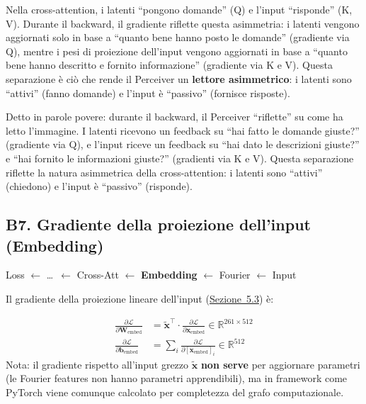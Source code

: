 \documentclass[12pt,a4paper]{article}
\begin{document}
\begin{notabox}
Nella cross-attention, i latenti ``pongono domande'' (Q) e l'input ``risponde'' (K, V). Durante il backward, il gradiente riflette questa asimmetria: i latenti vengono aggiornati solo in base a ``quanto bene hanno posto le domande'' (gradiente via Q), mentre i pesi di proiezione dell'input vengono aggiornati in base a ``quanto bene hanno descritto e fornito informazione'' (gradiente via K e V). Questa separazione \`e ci\`o che rende il Perceiver un \textbf{lettore asimmetrico}: i latenti sono ``attivi'' (fanno domande) e l'input \`e ``passivo'' (fornisce risposte).
\end{notabox}


\begin{notabox}
Detto in parole povere: durante il backward, il Perceiver ``riflette'' su come ha letto l'immagine. I latenti ricevono un feedback su ``hai fatto le domande giuste?'' (gradiente via Q), e l'input riceve un feedback su ``hai dato le descrizioni giuste?'' e ``hai fornito le informazioni giuste?'' (gradienti via K e V). Questa separazione riflette la natura asimmetrica della cross-attention: i latenti sono ``attivi'' (chiedono) e l'input \`e ``passivo'' (risponde).
\end{notabox}

\subsection{B7. Gradiente della proiezione dell'input (Embedding)} \label{sec:grad_embed}

\begin{pipelinebox}[title={\small Backward --- Passo corrente evidenziato}]
Loss $\leftarrow$ \ldots\ $\leftarrow$ Cross-Att $\leftarrow$ \textbf{Embedding} $\leftarrow$ Fourier $\leftarrow$ Input
\end{pipelinebox}

Il gradiente della proiezione lineare dell'input (\hyperref[sec:proiezione]{Sezione~5.3}) \`e:
\begin{formulabox}
\begin{align*}
    \frac{\partial \mathcal{L}}{\partial \mathbf{W}_{\text{embed}}} &= \tilde{\mathbf{x}}^\top \cdot \frac{\partial \mathcal{L}}{\partial \mathbf{x}_{\text{embed}}} \in \mathbb{R}^{261 \times 512} \\[4pt]
    \frac{\partial \mathcal{L}}{\partial \mathbf{b}_{\text{embed}}} &= \sum_i \frac{\partial \mathcal{L}}{\partial [\mathbf{x}_{\text{embed}}]_i} \in \mathbb{R}^{512}
\end{align*}
Nota: il gradiente rispetto all'input grezzo $\tilde{\mathbf{x}}$ \textbf{non serve} per aggiornare parametri (le Fourier features non hanno parametri apprendibili), ma in framework come PyTorch viene comunque calcolato per completezza del grafo computazionale.
\end{formulabox}
\end{document}
